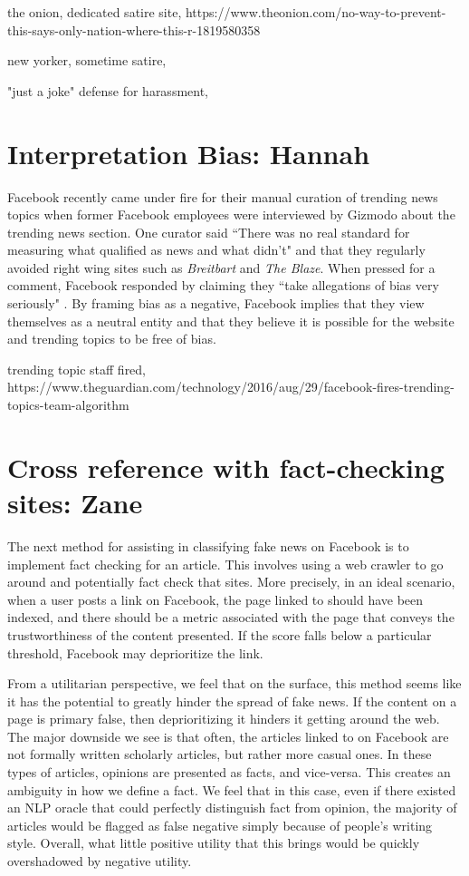 \documentclass[12pt]{article}
\begin{document}
the onion, dedicated satire site, https://www.theonion.com/no-way-to-prevent-this-says-only-nation-where-this-r-1819580358

new yorker, sometime satire, 

"just a joke" defense for harassment, 



\section{Interpretation Bias: Hannah}
Facebook recently came under fire for their manual curation of trending news topics when former Facebook employees were interviewed by Gizmodo about the trending news section. One curator said ``There was no real standard for measuring what qualified as news and what didn't" and that they regularly avoided right wing sites such as \textit{Breitbart} and \textit{The Blaze}. When pressed for a comment, Facebook responded by claiming they ``take allegations of bias very seriously" \citep{gizmodo_fb_news_curation}. By framing bias as a negative, Facebook implies that they view themselves as a neutral entity and that they believe it is possible for the website and trending topics to be free of bias.


trending topic staff fired, https://www.theguardian.com/technology/2016/aug/29/facebook-fires-trending-topics-team-algorithm



\section{Cross reference with fact-checking sites: Zane}
The next method for assisting in classifying fake news on Facebook is to implement fact checking for an article. This involves using a web crawler to go around and potentially fact check that sites. More precisely, in an ideal scenario, when a user posts a link on Facebook, the page linked to should have been indexed, and there should be a metric associated with the page that conveys the trustworthiness of the content presented. If the score falls below a particular threshold, Facebook may deprioritize the link.  

From a utilitarian perspective, we feel that on the surface, this method seems like it has the potential to greatly hinder the spread of fake news. If the content on a page is primary false, then deprioritizing it hinders it getting around the web. The major downside we see is that often, the articles linked to on Facebook are not formally written scholarly articles, but rather more casual ones. In these types of articles, opinions are presented as facts, and vice-versa. This creates an ambiguity in how we define a fact. We feel that in this case, even if there existed an NLP oracle that could perfectly distinguish fact from opinion, the majority of articles would be flagged as false negative simply because of people's writing style. Overall, what little positive utility that this brings would be quickly overshadowed by negative utility.
\end{document}
